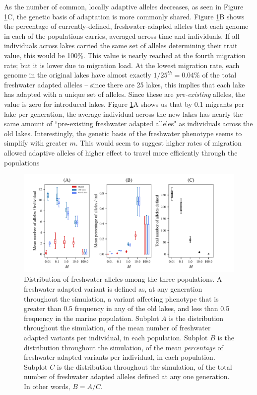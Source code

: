\documentclass{article}
\newcommand{\jgg}[1]{\todo[linecolor=green,backgroundcolor=green!25,bordercolor=black]{#1}}
\begin{document}
As the number of common, locally adaptive alleles decreases, as seen in Figure \ref{fig:MPFAI}C,
the genetic basis of adaptation is more commonly shared.
Figure \ref{fig:MPFAI}B shows
the percentage of currently-defined, freshwater-adapted alleles 
that each genome in each of the populations carries,
averaged across time and individuals.
If all individuals across lakes carried the same set of alleles determining their trait value,
this would be 100\%.
This value is nearly reached at the fourth migration rate;
but it is lower due to migration load.
At the lowest migration rate, 
each genome in the original lakes have almost exactly $1/25^{th} = 0.04\%$   
of the total freshwater adapted alleles --
since there are 25 lakes, this implies that each lake has adapted with a unique set of alleles.
Since these are \emph{pre-existing} alleles, the value is zero for introduced lakes.
Figure \ref{fig:MPFAI}A shows us that by $0.1$ migrants per lake per generation,
the average individual across the new lakes has nearly the same amount of 
``pre-existing freshwater adapted alleles" as individuals across the old lakes.
Interestingly, the genetic basis of the freshwater phenotype 
seems to simplify with greater $m$. 
This would seem to suggest higher rates of migration allowed 
adaptive alleles of higher effect to travel more efficiently through the populations
\jgg{is this right?}

\begin{figure}
	\begin{center}
  		\includegraphics{Final_Plots/Freshwater_Alleles.pdf}
  		\caption{
		Distribution of freshwater alleles among the three populations. 
		A freshwater adapted variant is defined as, at any generation throughout the simulation,
		a variant affecting phenotype that is greater than 0.5 frequency in any of the old lakes, 
		and less than 0.5 frequency in the marine population. 
		Subplot $A$ is the distribution throughout the simulation, of the mean number of
		freshwater adapted variants per individual, in each population.
		Subplot $B$ is the distribution throughout the simulation, of the mean \emph{percentage} of
		freshwater adapted variants per individual, in each population. 
		Subplot $C$ is the distribution throughout the simulation, of the total number of
		freshwater adapted alleles defined at any one generation.
		In other words, $B  =  A  /  C$.
		}
		\label{fig:MPFAI}
	\end{center}
\end{figure}
\end{document}
